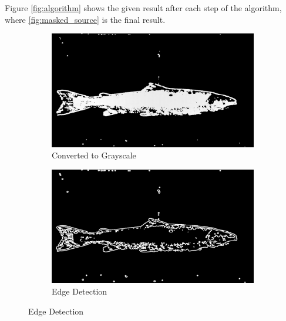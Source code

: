 Figure \ref{fig:algorithm} shows the given result after each step of the algorithm, where \ref{fig:masked_source} is the final result.


\begin{figure}[H]
    \begin{subfigure}{0.49\textwidth}
        \includegraphics[width=\linewidth]{images/implementation/4_1_grayscale}
        \caption{Converted to Grayscale} 
        \label{fig:grayscale}
    \end{subfigure}\hspace*{\fill}
    \begin{subfigure}{0.49\textwidth}
        \includegraphics[width=\linewidth]{images/implementation/4_2_edge_detector}
        \caption{Edge Detection} 
        \label{fig:edge_detection}
    \end{subfigure}
    

\end{figure}
